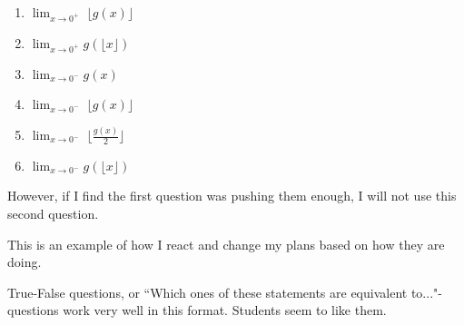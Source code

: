 \documentclass[11pt]{article}
\begin{document}
\begin{example}
\begin{comments}
\begin{center}
\begin{minipage}{0.2\textwidth}
\begin{enumerate}
						\item ${\displaystyle \lim_{x \to 0^+} \; \lfloor g(x) \rfloor}$

						\item ${\displaystyle \lim_{x \to 0^+} g(\lfloor x \rfloor)}$

						\item ${\displaystyle \lim_{x \to 0^-} g(x)}$

						\item ${\displaystyle \lim_{x \to 0^-} \; \lfloor g(x) \rfloor}$

						\item ${\displaystyle \lim_{x \to 0^-} \; \lfloor \frac{g(x)}{2} \rfloor}$

						\item ${\displaystyle \lim_{x \to 0^-} g(\lfloor x \rfloor)}$
					\end{enumerate}
				\end{minipage}
			\end{center}

			\vspace{.5cm}

			However, if I find the first question was pushing them enough, I will not use
			this second question.

			This is an example of how I react and change my plans based on how they are
			doing.
		\end{comments}
	\end{example}

	\newpage

	True-False questions, or ``Which ones of these statements are equivalent to..."-questions
	work very well in this format. Students seem to like them.
\end{document}
